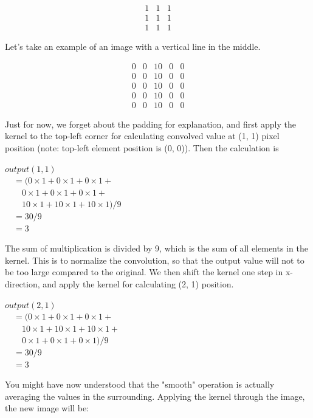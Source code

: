 \[
 \begin{matrix}
  1 & 1 & 1 \\
  1 & 1 & 1 \\
  1 & 1 & 1
 \end{matrix}
\]

Let's take an example of an image with a vertical line
in the middle.


\[
 \begin{matrix}
  0 & 0 & 10 & 0 & 0 \\
  0 & 0 & 10 & 0 & 0 \\
  0 & 0 & 10 & 0 & 0 \\
  0 & 0 & 10 & 0 & 0 \\
  0 & 0 & 10 & 0 & 0 
 \end{matrix}
\]


Just for now, we forget about the padding for explanation, and first
apply the kernel to the top-left corner for
calculating convolved value at (1, 1) pixel position (note: top-left element position is (0, 0)).
Then the calculation is


$output( 1 , 1 )$\\
$\quad = ( 0 \times 1 + 0 \times 1 + 0 \times 1 + $\\
$\qquad 0 \times 1 + 0 \times 1 + 0 \times 1 + $\\
$\qquad 10 \times 1 + 10 \times 1 + 10 \times 1 ) / 9 $\\
$\quad = 30 / 9 $\\
$\quad = 3$

The sum of multiplication is divided by 9, which is the sum of all
elements in the kernel. This is to normalize the convolution, so that
the output value will not to be too large compared to the original. We
then shift the kernel one step in x-direction, and apply the kernel for
calculating (2, 1) position. 

$output( 2 , 1)$\\
$\quad = ( 0 \times 1 + 0 \times 1 + 0 \times 1 + $\\
$\qquad 10 \times 1 + 10 \times 1+ 10 \times 1 +$\\ 
$\qquad 0 \times 1 + 0 \times 1 + 0 \times 1) / 9 $\\
$\quad = 30 / 9$\\ 
$\quad = 3$

You might have now understood that the
"smooth" operation is actually
averaging the values in the surrounding. Applying the kernel through
the image, the new image will be: 

